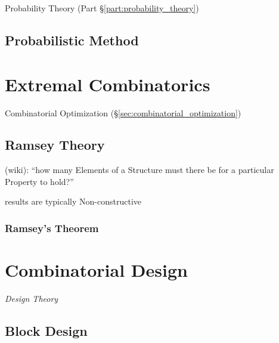 Probability Theory (Part \S\ref{part:probability_theory})



\subsection{Probabilistic Method}\label{sec:probabilistic_method}



\section{Extremal Combinatorics}\label{sec:extremal_combinatorics}

Combinatorial Optimization (\S\ref{sec:combinatorial_optimization})



\subsection{Ramsey Theory}\label{sec:ramsey_theory}

(wiki): ``how many Elements of a Structure must there be for a particular
Property to hold?''

results are typically Non-constructive



\subsubsection{Ramsey's Theorem}\label{sec:ramseys_theorem}



\section{Combinatorial Design}\label{sec:combinatorial_design}

\emph{Design Theory}



\subsection{Block Design}\label{sec:block_design}
